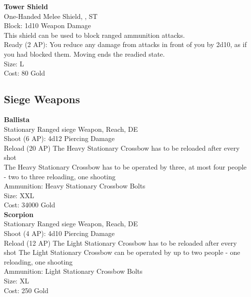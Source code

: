\textbf{Tower Shield}\label{weapon:towerShield}\\
One-Handed Melee Shield, , ST\\
Block: 1d10 Weapon Damage\\
This shield can be used to block ranged ammunition attacks.\\
Ready (2 AP): You reduce any damage from attacks in front of you by 2d10, as if you had blocked them.
Moving ends the readied state.\\
Size: L\\
Cost: 80 Gold\\


\subsection{Siege Weapons}\label{subsec:siegeWeapons}
\textbf{Ballista}\label{weapon:ballista}\\
Stationary Ranged siege Weapon,  Reach, DE\\
Shoot (6 AP): 4d12 Piercing Damage\\
Reload (20 AP) The Heavy Stationary Crossbow has to be reloaded after every shot\\
The Heavy Stationary Crossbow has to be operated by three, at most four people - two to three reloading, one shooting\\
Ammunition: Heavy Stationary Crossbow Bolts\\
Size: XXL\\
Cost: 34000 Gold\\

\textbf{Scorpion}\label{weapon:scorpion}\\
Stationary Ranged siege Weapon,  Reach, DE\\
Shoot (4 AP): 4d10 Piercing Damage\\
Reload (12 AP) The Light Stationary Crossbow has to be reloaded after every shot
The Light Stationary Crossbow can be operated by up to two people - one reloading, one shooting\\
Ammunition: Light Stationary Crossbow Bolts\\
Size: XL\\
Cost: 250 Gold\\
